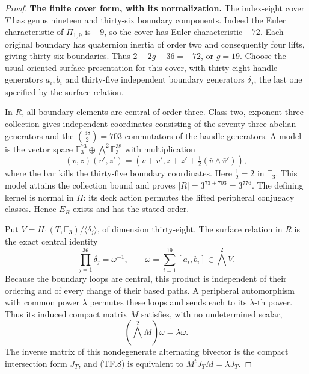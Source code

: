 \begin{proof}
\par\medskip\noindent\textbf{The finite cover form, with its normalization.}\quad
The index-eight cover \(T\) has genus nineteen and
thirty-six boundary components. Indeed the Euler
characteristic of \(\Pi_{1,9}\) is \(-9\), so the cover
has Euler characteristic \(-72\). Each original boundary
has quaternion inertia of order two and consequently four
lifts, giving thirty-six boundaries. Thus
\(2-2g-36=-72\), or \(g=19\).
Choose the usual oriented surface presentation for this cover,
with thirty-eight handle generators \(a_i,b_i\) and thirty-five
independent boundary generators \(\delta_j\), the last one
specified by the surface relation.

In \(R\), all boundary elements are central of order three.
Class-two, exponent-three collection gives independent
coordinates consisting of the seventy-three abelian
generators and the \(\binom{38}{2}=703\) commutators of
the handle generators. A model is the vector space
\(\mathbb F_3^{73}\oplus\bigwedge^2\mathbb F_3^{38}\)
with multiplication
\[
 (v,z)(v',z')=
 (v+v',z+z'+\tfrac12(\bar v\wedge\bar v')),
 \tag{TF.6}
\]
where the bar kills the thirty-five boundary coordinates.
Here \(\tfrac12=2\) in \(\mathbb F_3\).
This model attains the collection bound and proves
\(|R|=3^{73+703}=3^{776}\). The defining kernel is
normal in \(\Pi\): its deck action permutes the lifted
peripheral conjugacy classes. Hence \(E_R\) exists and
has the stated order.

Put \(V=H_1(T,\mathbb F_3)/\langle\delta_j\rangle\),
of dimension thirty-eight. The surface relation in \(R\)
is the exact central identity
\[
 \prod_{j=1}^{36}\delta_j=\omega^{-1},
 \qquad \omega=\sum_{i=1}^{19}[a_i,b_i]
                         \in\bigwedge^2V.
 \tag{TF.7}
\]
Because the boundary loops are central, this product is
independent of their ordering and of every change of their
based paths. A peripheral automorphism with common power
\(\lambda\) permutes these loops and sends each to its
\(\lambda\)-th power. Thus its induced compact matrix
\(M\) satisfies, with no undetermined scalar,
\[
                (\bigwedge^2M)\omega=\lambda\omega.
 \tag{TF.8}
\]
The inverse matrix of this nondegenerate alternating
bivector is the compact intersection form \(J_T\), and
(TF.8) is equivalent to \(M^tJ_TM=\lambda J_T\).


\end{proof}
